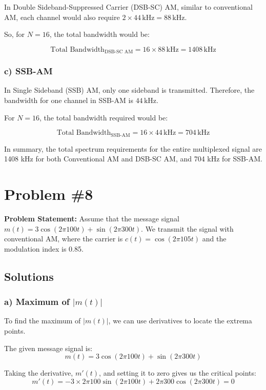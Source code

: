 \documentclass{article}
\begin{document}
In Double Sideband-Suppressed Carrier (DSB-SC) AM, similar to conventional AM, each channel would also require \(2 \times 44 \, \text{kHz} = 88 \, \text{kHz}\).

So, for \(N = 16\), the total bandwidth would be:

\[
\text{Total Bandwidth}_{\text{DSB-SC AM}} = 16 \times 88 \, \text{kHz} = 1408 \, \text{kHz}
\]

\subsubsection*{c) SSB-AM}

In Single Sideband (SSB) AM, only one sideband is transmitted. Therefore, the bandwidth for one channel in SSB-AM is \(44 \, \text{kHz}\).

For \(N = 16\), the total bandwidth required would be:

\[
\text{Total Bandwidth}_{\text{SSB-AM}} = 16 \times 44 \, \text{kHz} = 704 \, \text{kHz}
\]

In summary, the total spectrum requirements for the entire multiplexed signal are 1408 kHz for both Conventional AM and DSB-SC AM, and 704 kHz for SSB-AM.

\newpage
\section*{Problem \#8}

\textbf{Problem Statement:} Assume that the message signal \( m(t) = 3\cos(2\pi 100t) + \sin(2\pi 300t) \). We transmit the signal with conventional AM, where the carrier is \( c(t) = \cos(2\pi 105t) \) and the modulation index is 0.85.

\subsection*{Solutions}

\subsubsection*{a) Maximum of \( |m(t)| \)}

To find the maximum of \( |m(t)| \), we can use derivatives to locate the extrema points.

The given message signal is:
\[
m(t) = 3\cos(2\pi 100t) + \sin(2\pi 300t)
\]

Taking the derivative, \( m'(t) \), and setting it to zero gives us the critical points:
\[
m'(t) = -3 \times 2\pi 100 \sin(2\pi 100t) + 2\pi 300 \cos(2\pi 300t) = 0
\]
\end{document}
